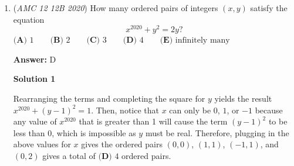 \begin{enumerate}
 



\textbf{Solution 6 (Cheating)}

Let the smaller slope be $m$, then the larger slope is $6m$. Since we want the greatest product we begin checking each answer choice, starting with (E). 

 $6m^2=6$.

 $m^2=1$.

 This gives $m=1$ and $6m=6$. Checking with a protractor we see that this does not form a 45 degree angle.

 Using this same method for the other answer choices, we eventually find that the answer is $\boxed{\textbf{(C)}\  \frac32}$ since our slopes are $\frac12$ and $3$ which forms a perfect 45 degree angle.

 



\textbf{Solution 7}

If you have this formula memorized then it will be very easy to do: If $\theta$ is the angle between two lines with slopes $m_1$ and $m_2$, then $\tan(\theta)=\frac{m_1-m_2}{1+m_1m_2}$.

 Now let the smaller slope be $m$, thus the other slope is $6m$. Using our formula above: 
 \[\tan(45^\circ)=\frac{6m-m}{1+6m^2} \implies 6m^2-5m+1=0 \implies (2m-1)(3m-1)=0.\] Therefore the two possible values for $m$ are $\frac{1}{2}$ and $\frac{1}{3}$. We choose the larger one and thus our answer is 
 \[6m^2=6 \cdot \frac{1}{4} = \frac{3}{2} \implies \boxed{\mathbf{(C)}}.\]



	\item (\textit{AMC 12 12B 2020}) How many ordered pairs of integers $(x, y)$ satisfy the equation
 \[x^{2020}+y^2=2y?\]
$\textbf{(A) } 1 \qquad\textbf{(B) } 2 \qquad\textbf{(C) } 3 \qquad\textbf{(D) } 4 \qquad\textbf{(E) } \text{infinitely many}$

 \textbf{Answer: }D



\textbf{Solution 1}

Rearranging the terms and completing the square for $y$ yields the result $x^{2020}+(y-1)^2=1$. Then, notice that $x$ can only be $0$, $1$, or $-1$ because any value of $x^{2020}$ that is greater than 1 will cause the term $(y-1)^2$ to be less than $0$, which is impossible as $y$ must be real. Therefore, plugging in the above values for $x$ gives the ordered pairs $(0,0)$, $(1,1)$, $(-1,1)$, and $(0,2)$ gives  a  total  of $\boxed{\textbf{(D) }4}$ ordered pairs.


\end{enumerate}
